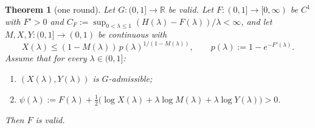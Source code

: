 \documentclass[11pt]{article}
\newtheorem{theorem}{Theorem}[section]
\theoremstyle{definition}
\newcommand{\R}{\mathbb{R}}
\newcommand{\lam}{\lambda}
\begin{document}
\begin{theorem}[one round]\label{thm:onestep}
Let $G\colon(0,1]\to\R$ be valid.  Let $F\colon(0,1]\to[0,\infty)$ be $C^1$ with $F'>0$ and $C_F:=\sup_{0<\lam\le1}(H(\lam)-F(\lam))/\lam<\infty$, and let $M,X,Y\colon(0,1]\to(0,1)$ be continuous with
\begin{equation}\label{eq:pX}
X(\lam)\le(1-M(\lam))\,p(\lam)^{1/(1-M(\lam))},\qquad p(\lam):=1-e^{-F'(\lam)} .
\end{equation}
Assume that for every $\lam\in(0,1]$:
\begin{enumerate}[label=\textup{(A\arabic*)},leftmargin=3em]
\item $(X(\lam),Y(\lam))$ is $G$-admissible;
\item $\psi(\lam):=F(\lam)+\tfrac12\bigl(\log X(\lam)+\lam\log M(\lam)+\lam\log Y(\lam)\bigr)>0$.
\end{enumerate}
Then $F$ is valid.
\end{theorem}
\end{document}
